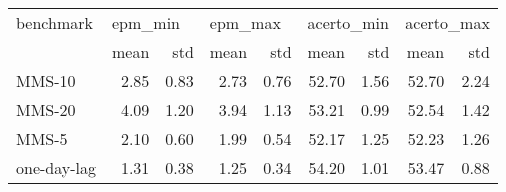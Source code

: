 \begin{tabular}{lrrrrrrrr}
\toprule
  benchmark & \multicolumn{2}{l}{epm\_min} & \multicolumn{2}{l}{epm\_max} & \multicolumn{2}{l}{acerto\_min} & \multicolumn{2}{l}{acerto\_max} \\
            &    mean &  std &    mean &  std &       mean &  std &       mean &  std \\
\midrule
     MMS-10 &    2.85 & 0.83 &    2.73 & 0.76 &      52.70 & 1.56 &      52.70 & 2.24 \\
     MMS-20 &    4.09 & 1.20 &    3.94 & 1.13 &      53.21 & 0.99 &      52.54 & 1.42 \\
      MMS-5 &    2.10 & 0.60 &    1.99 & 0.54 &      52.17 & 1.25 &      52.23 & 1.26 \\
one-day-lag &    1.31 & 0.38 &    1.25 & 0.34 &      54.20 & 1.01 &      53.47 & 0.88 \\
\bottomrule
\end{tabular}
